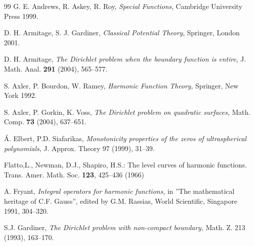 \documentclass[12pt]{amsart}
\begin{document}
\begin{thebibliography}{99}
	 G. E. Andrews, R. Askey, R. Roy, \emph{Special Functions},
	Cambridge University Press 1999.
	
	 D. H. Armitage, S. J. Gardiner, \emph{Classical Potential
		Theory}, Springer, London 2001.
	
	 D. H. Armitage, \emph{The Dirichlet problem when the boundary
		function is entire,} J. Math. Anal. \textbf{291} (2004), 565--577.
	
	 S. Axler, P. Bourdon, W. Ramey, \emph{Harmonic Function
		Theory,} Springer, New York 1992.
	
	 S. Axler, P. Gorkin, K. Voss, \emph{The Dirichlet problem on
		quadratic surfaces,} Math. Comp. \textbf{73} (2004), 637--651.
	
	
	
	
	
	
	 \'{A}. Elbert, P.D. Siafarikas, \emph{Monotonicity
		properties of the zeros of ultraspherical polynomials,} J. Approx. Theory 97
	(1999), 31--39.
	
	 Flatto,L., Newman, D.J., Shapiro, H.S.: {The level curves of
		harmonic functions.} Trans. Amer. Math. Soc. \textbf{123}, 425--436 (1966)
	
	 A. Fryant, \emph{Integral operators for harmonic functions,}
	in \textquotedblright The mathematical heritage of C.F.
	Gauss\textquotedblright , edited by G.M. Rassias, World Scientific,
	Singapore 1991, 304--320.

	
	 S.J. Gardiner, \emph{The Dirichlet problem with non-compact
		boundary,} Math. Z. 213 (1993), 163--170.
	

\end{thebibliography}
\end{document}
